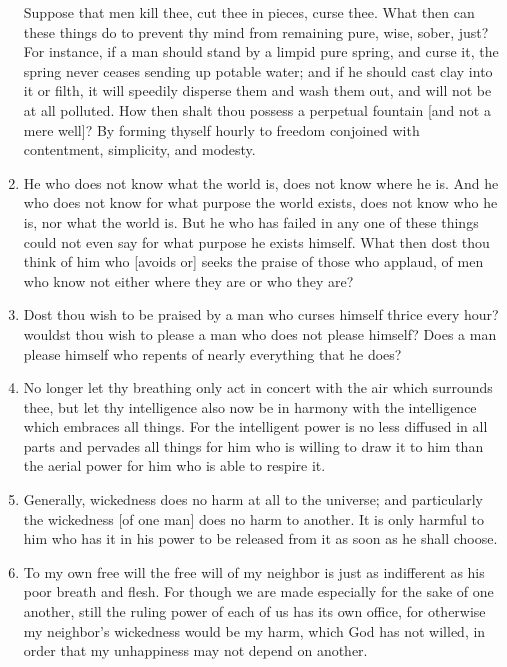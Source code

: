 \begin{enumerate}
Suppose that men kill thee, cut thee in pieces, curse thee. What then can these things do to prevent thy mind from remaining pure, wise, sober, just? For instance, if a man should stand by a limpid pure spring, and curse it, the spring never ceases sending up potable water; and if he should cast clay into it or filth, it will speedily disperse them and wash them out, and will not be at all polluted. How then shalt thou possess a perpetual fountain [{\clarify and not a mere well}]? By forming thyself hourly to freedom conjoined with contentment, simplicity, and modesty.

\item He who does not know what the world is, does not know where he is. And he who does not know for what purpose the world exists, does not know who he is, nor what the world is. But he who has failed in any one of these things could not even say for what purpose he exists himself. What then dost thou think of him who [{\clarify avoids or}] seeks the praise of those who applaud, of men who know not either where they are or who they are?

\item Dost thou wish to be praised by a man who curses himself thrice every hour? wouldst thou wish to please a man who does not please himself? Does a man please himself who repents of nearly everything that he does?

\item No longer let thy breathing only act in concert with the air which surrounds thee, but let thy intelligence also now be in harmony with the intelligence which embraces all things. For the intelligent power is no less diffused in all parts and pervades all things for him who is willing to draw it to him than the aerial power for him who is able to respire it.

\item Generally, wickedness does no harm at all to the universe; and particularly the wickedness [{\clarify of one man}] does no harm to another. It is only harmful to him who has it in his power to be released from it as soon as he shall choose.

\item To my own free will the free will of my neighbor is just as indifferent as his poor breath and flesh. For though we are made especially for the sake of one another, still the ruling power of each of us has its own office, for otherwise my neighbor's wickedness would be my harm, which God has not willed, in order that my unhappiness may not depend on another.


\end{enumerate}
